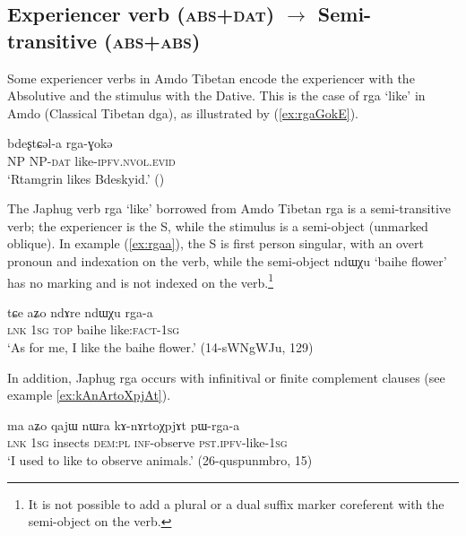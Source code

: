\documentclass[oldfontcommands,oneside,a4paper,11pt]{article}
\newcommand{\ipa}[1]{{\phon \mbox{#1}}} %
\newcommand{\refb}[1]{(\ref{#1})}
\begin{document}
\subsection{Experiencer verb (\textsc{abs+dat}) $\rightarrow$ Semi-transitive (\textsc{abs+abs})}
Some experiencer verbs in Amdo Tibetan encode the experiencer with the Absolutive and the stimulus with the Dative. This is the case of \ipa{rga} `like' in Amdo (Classical Tibetan \ipa{dga}), as illustrated by \refb{ex:rgaGokE}.

\begin{exe}
\ex \label{ex:rgaGokE}
\gll \ipa{ʂtamɖʐən}  \ipa{bdeʂtɕəl-a}  \ipa{rga-ɣokə} \\
NP NP-\textsc{dat} like-\textsc{ipfv.nvol.evid} \\
\glt `Rtamgrin likes Bdeskyid.' (\citealt[123, ex. 547]{haller04themchen})
\end{exe}

The Japhug verb \ipa{rga} `like' borrowed from Amdo Tibetan \ipa{rga} is a semi-transitive verb; the experiencer is the S, while the stimulus is a semi-object (unmarked oblique). In example \refb{ex:rgaa}, the S is first person singular,  with an overt pronoun and indexation on the verb, while the semi-object \ipa{ndɯχu} `baihe flower' has no marking and is not indexed on the verb.\footnote{It is not possible to add a plural or a dual suffix marker coreferent with the semi-object on the verb.}  

\begin{exe}
\ex \label{ex:rgaa}
\gll
\ipa{tɕe} 	\ipa{aʑo} 	\ipa{ndɤre} 	\ipa{ndɯχu} 	\ipa{rga-a} \\
\textsc{lnk} \textsc{1sg} \textsc{top} baihe like:\textsc{fact}-\textsc{1sg} \\
\glt `As for me, I like the baihe flower.' (14-sWNgWJu, 129)
\end{exe}


In addition, Japhug \ipa{rga}  occurs with infinitival or finite complement clauses (see example \ref{ex:kAnArtoXpjAt}).

\begin{exe}
\ex \label{ex:kAnArtoXpjAt}
\gll  
\ipa{ma} 	\ipa{aʑo} 	\ipa{qajɯ} 	\ipa{nɯra} 	\ipa{kɤ-nɤrtoχpjɤt} 	\ipa{pɯ-rga-a} \\
\textsc{lnk} \textsc{1sg} insects \textsc{dem:pl} \textsc{inf}-observe \textsc{pst.ipfv}-like-\textsc{1sg} \\
\glt `I used to like to observe animals.' (26-quspunmbro, 15)
\end{exe}
\end{document}
